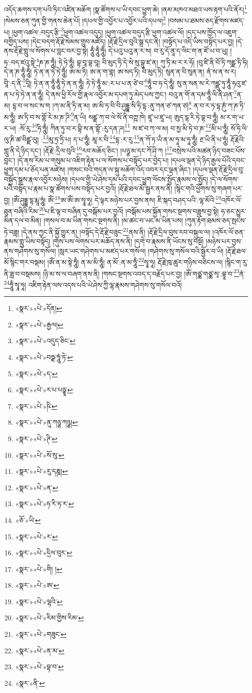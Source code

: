 འདོད་ཆགས་དག་པའི་ཏིང་འཛིན་མཆོག །སྣ་ཚོགས་པ་ཡི་དབང་ཕྱུག་ཆེ། །ནམ་མཁའ་མཐའ་ཡས་རྟག་པའི་ནོར།\footnote{«སྣར་»«པེ་»དོན།} །སེམས་ཅན་ཀུན་གྱི་གནས་ཆེན་པོ། །དཔལ་གྱི་འབྱོར་པ་འབྱོར་པའི་དཔལ།\footnote{«སྣར་»«པེ་»རྒྱལ།} །བསམ་པ་ཐམས་ཅད་རྫོགས་མཛད་པ། །ཕྱག་འཚལ་:བདུད་རྩི་\footnote{«སྣར་»«པེ་»འདུད་ཅིང་}ཕྱག་འཚལ་འདུད། །ཕྱག་འཚལ་བདུད་རྩི་ཕྱག་འཚལ་ལོ། །དད་པས་ཁྱོད་ལ་འཇུག་བགྱིད་པས། །དེང་བདག་རྡོ་རྗེ་སེམས་གྲུབ་མཛོད། །རྡོ་རྗེ་དྲིལ་བུའི་སྒྲ་དང་ནི། །བསྟོད་པ་འདི་ཡིས་བསྟོད་པར་བྱ། །དེ་ནས་རྡོ་རྗེ་གླུ་ལ་སོགས་པ་བླང་བར་བྱ་སྟེ། ཧཱུྃ་ཧཱུྃ་ཧཱུྃ། དེ་པའུ་པའུ་ན་ར་ས། བ་རུ་དོ་ནཱ་ད་ལིང་ག་ན་ཛོ་ཡ་བ་ཡུ། །ཧ་:བད་ཛའུ་སྟེ་\footnote{«སྣར་»«པེ་»བཏྫ་ཧཱུཾ་ཏེ་}ཎ་ཎ་ཧཱུྃ། ཏེ་ཏེ་ཧཱུྃ། བྷ་བཱ་བྷ་བཱ། བི་མུད་ཏི་དེ་སེ་སུ་བྷུ་ཛ་ན། ཀུ་ཏི་མ་ར་ར་ཧོ། །བུ་ཛི་ནི་བོ་ཏི་ཀཛྫ་ཏི་ཧི། དེ་ན་ཎ་ཧཱུྃ་ཧཱུྃ། ཏེ་ན་ན་ཏེ་ཏེ་ཧཱུྃ། ཨ་མ་ཏི། ཨ་ན་ག་གྷ། ཨ་སད་ཏི། བི་མུད་ཏི། སུན་ན་བི་སུན་ན། ནཾ་ས་ན་ས་ར། བཱི་:ད་ནི་\footnote{«སྣར་»«པེ་»ད་}བཱི། ཏེ་ན་ན་ཧཱུྃ་ཧཱུྃ་ཏེ་ན་ན་ཧཱུྃ། ཏེ་ཏེ་ཧཱུྃ་མ་:ར་པ་པ་ན་ཙེ་བ་\footnote{«སྣར་»«པེ་»ར་པ་པཉྩཱ་}ཧཱུྃ་བ་ཧ་དེ་ཧཱུྃ། སུ་ན་སན་ས་རེ་ཀཛྫུ་ཏུ་ཧཱུྃ་ཧའུ་ཛ་ན་པ་ཏེ་ཏེ་ན་ན་ཧཱུྃ། དེ་ནས་ཕྱི་རོལ་གྱི་རྣལ་འབྱོར་མ་དཔག་ཏུ་མེད་པས་ཀྱང་། བའུ་ན་གོ་ན་དམ་ཧཱུྃ་ལི་ནི་ཤན་\footnote{«སྣར་»«པེ་»ཥི་}ན་མ། དྷ་བ་ལ་སང་ས་ག །ཀ་མ་ནི་ཏི་ན་མ། ཨ་མི་ཏ་བི་བི་ཤུདྡྷ་སི་ཧི་དྷ་:ནུ་ཀན་ཙ་ཀན་ཙ།\footnote{«སྣར་»«པེ་»ནུ་ཀཉྩ་ཀཉྩ།} ན་བ་ར་ཏ་དྷ་ཎུཾ་ཀ་ཎ་ཏི་མ་ཧཱུྃ། ཨ་ཏི་བ་ས་གྷོ་རེ་མ་ཎ་ཌི་\footnote{«སྣར་»«པེ་»ཊི་}ན་ཡི། སཛྫ་ཀ་བ་ལེ་སོ་ནི་བཀྵ་ཁེ། ཛཱ་ཡ་ཛཱ་ཡ། ཨུད་དྷ་རི་ཏེ་བྷ་བ་ཧཱུྃ། མ་ར་ག་ཡ་ར་ཡ། :སོ་རུ་\footnote{«སྣར་»«པེ་»སོ་སུ་}ཧི་ཧཱུྃ། ཀིན་ཏུ་བ་ར་བྷི་ས་ན་གྷོ་:རུ་དན་ཌ།\footnote{«སྣར་»«པེ་»རུ་དཎྜ།} ས་ཛ་བ་ཀ་ལ་མ། བ་སྱ་མི་ཏེ་བ་ཎ་\footnote{«སྣར་»«པེ་»ན་}མི་པ་ཧཱུྃ། སོ་ཧི་ལི་ལུ་ཎི་ཚ་བིཛྫ་ལུ། :\footnote{«སྣར་»«པེ་»ཧ་རི་ཧ་ར་}མུ་ཏྲ་ཏྲི་པ། ད་པ་ཧཱུྃ། མཱ་ར་བི་\footnote{«ཅོ་»ཡི་}དྷ་:ར་རུ་\footnote{«སྣར་»«པེ་»ར་}ན་ཀོ་ཏ་ཡྃ་ན་མ་ཧཱ་མ་ཧཱ་ཧཱུྃ། རྔ་ཡི་ནི་པ་ཧཱུཾ། རྡོ་རྗེའི་གླུ་ནི་དེ་ཉིད་དང་། །རྡོ་རྗེ་:དྲིལ་བུའི་\footnote{«སྣར་»«པེ་»དྲིལ་བུར་}རབ་མཆོད་ཅིང་། །པཉྩ་མ་དང་ཀོ་ཤི་ཀ །\footnote{«སྣར་»«པེ་»གི། །}བསྲེས་པའི་མཚན་ཉིད་བཟང་པོས་བླང་། །དེ་ནས་རིམ་པ་གསུམ་པ་འཇིག་རྟེན་པ་ལ་སོགས་པ་བསྟོད་པར་བྱེད་པ། །དཔལ་ལྡན་དེ་ཉིད་རྒྱལ་པོའི་དབང་ཕྱུག་དམ་པ་ཅོད་པན་མཛེས། །གསང་བའི་གདན་ལ་སྐུ་མཆོག་འོད་འབར་དང་ལྡན་ཞིང་། །དཔལ་ལྡན་རྡོ་རྗེ་དྲིལ་བུ་བསྐྱོད་སྒྲས་རྣལ་འབྱོར་མཉེས། །དཔལ་གྱི་ཡེ་ཤེས་དམ་པའི་དབང་ཕྱུག་ལོངས་སྤྱོད་རྣམས་ལ་སྤྱོད། །དེ་ལ་སོགས་པའི་བསྟོད་པ་རྣམ་པ་སྣ་ཚོགས་པས་བསྟོད་པར་བྱའོ། །རྡོ་རྗེ་ཐལ་མོ་སྦྱར་ནས་ནི། །སྙིང་གའི་ཕྱོགས་སུ་གཞག་པར་བྱ། །ཨོཾ་ཤུདྡྷ་དྷ་རྨཱ་ཧཱུཾ། ཨོཾ་\footnote{«སྣར་»«པེ་»ཨ་}ཨ་ཨོཾ་ཨ་སྭཱ་ཧཱ། དེ་ལྟར་མཉེས་པར་བྱས་ནས། ཇི་སྐད་བཤད་པའི་:ལྷ་མོའི་\footnote{«སྣར་»«པེ་»ལྷའི་}འཁོར་ལོ་ཐུན་བཞིའི་རིམ་\footnote{«སྣར་»«པེ་»རིམ་གྱིས་རིམ་}པ་ཇི་ལྟ་བ་བཞིན་དུ་བསྒོམ་པར་བྱའོ། །བསྒོམ་པས་སྐྱོན་གསང་སྔགས་བཟླས་བྱ་སྟེ། ཧ་ཅང་མྱུར་མིན་དལ་བ་མིན། །གསལ་བ་མ་ཡིན་གསང་སྔགས་ནི། །མ་ཚང་བ་ཡང་མ་ཡིན་པས། །ཀུན་རྟོག་ཐམས་ཅད་སྤངས་ཏེ་བཟླ། །དེ་ནས་ཀྱང་ནི་སྐྱོ་གྱུར་ན། །བསྟོད་དེ་རྡོ་རྗེ་བཟུང་\footnote{«སྣར་»«པེ་»གཟུང་}ནས་ནི། །རྡོ་རྗེ་དྲིལ་བུས་རབ་བསྐུལ་ལ། །འཁོར་ལོ་ཅན་རྣམས་གླུ་ཡིས་བསྟོད། །གུས་པས་ལེགས་པར་མཆོད་ནས་ནི། །དགེ་བ་རྣམས་ནི་ཡོངས་སུ་བསྔོ། །མཉེས་པར་བྱས་ནས་གཤེགས་སུ་གསོལ། །སླར་ཡང་གཤེགས་པ་མཛད་པར་གསོལ། །གཤེགས་སུ་གསོལ་བའི་སྦྱོར་བ་ཡི། །རྡོ་རྗེ་ཐལ་མོ་སྙིང་གར་བསྡམ། །ཨོཾ་ན་མ་སྟེ་ཧཱུྃ། ན་མ་མི་ཧཱུྃ། ན་མོ་:ན་མ་ཧཱུྃ་\footnote{«སྣར་»«པེ་»ན་མ་}སྭཱ་ཧཱ། རྡོ་རྗེ་ཁུ་ཚུར་གཉིས་བཅིངས་ལ། །སྙིང་ག་རུ་ནི་ཟླ་བ་བསྡམས། །ཉི་མ་ས་ལ་བཞག་ནས་ནི། །གསང་སྔགས་འབད་ད་བརྗོད་པར་བྱ། །ཨོཾ་གཙྪ་གཙྪ་སྭ་:བྷཱ་བ་\footnote{«སྣར་»«པེ་»བྷ་བ་}ནཾ་\footnote{«སྣར་»ནི་}ཧཱུྃ་སྭཱ་ཧཱ། འཇིག་རྟེན་ལས་འདས་པའི་ཡེ་ཤེས་ཀྱི་ལྷ་རྣམས་གཤེགས་སུ་གསོལ་བའོ། 
